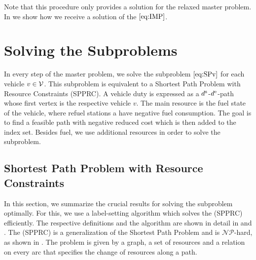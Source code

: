 Note that this procedure only provides a solution for the relaxed master problem. In  we show how we receive a solution of the $\eqref{eq:IMP}$.


\section{Solving the Subproblems}
\label{sec:solving_subproblem}

In every step of the master problem, we solve the subproblem $\eqref{eq:SPv}$ for each vehicle $v\in\mathcal{V}$. This subproblem is equivalent to a Shortest Path Problem with Resource Constraints (SPPRC). A vehicle duty is expressed as a $d^{\operatorname{s}}$-$d^{\operatorname{e}}$-path whose first vertex is the respective vehicle $v$. The main resource is the fuel state of the vehicle, where refuel stations a have negative fuel consumption. The goal is to find a feasible path with negative reduced cost which is then added to the index set. Besides fuel, we use additional resources in order to solve the subproblem.

\subsection{Shortest Path Problem with Resource Constraints}
\label{sec:spprc}

In this section, we summarize the crucial results for solving the subproblem optimally. For this, we use a label-setting algorithm which solves the (SPPRC) efficiently. The respective definitions and the algorithm are shown in detail in \cite{Kaiser} and \cite{Irnich_Desaulniers}. The (SPPRC) is a generalization of the Shortest Path Problem and is $\mathcal{NP}$-hard, as shown in \cite[p.~307]{Handler_Zang}. The problem is given by a graph, a set of resources and a relation on every arc that specifies the change of resources along a path. 

